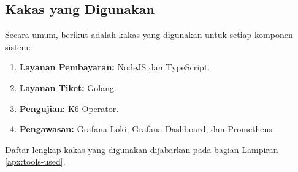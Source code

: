 \subsection{Kakas yang Digunakan}

Secara umum, berikut adalah kakas yang digunakan untuk setiap komponen sistem:

\begin{enumerate}
    \item \textbf{Layanan Pembayaran:} NodeJS dan TypeScript.
    \item \textbf{Layanan Tiket:} Golang.
    \item \textbf{Pengujian: } K6 Operator.
    \item \textbf{Pengawasan: } Grafana Loki, Grafana Dashboard, dan Prometheus.
\end{enumerate}

Daftar lengkap kakas yang digunakan dijabarkan pada bagian Lampiran \ref{apx:tools-used}.